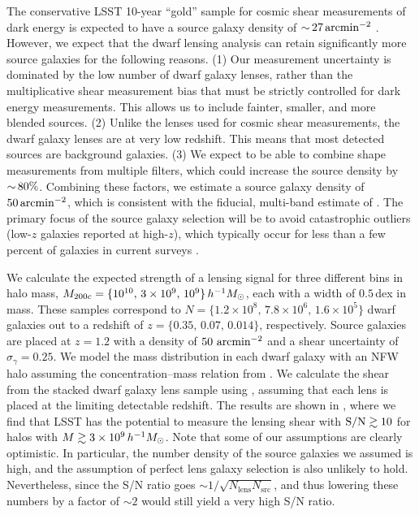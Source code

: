 The conservative LSST 10-year ``gold'' sample for cosmic shear measurements of dark energy is expected to have a source galaxy density of $ {\sim}\, 27 \mathrm{\,arcmin}^{-2}$ \citep{Chang:2013,1809.01669}. 
However, we expect that the dwarf lensing analysis can retain significantly more source galaxies for the following reasons.
(1) Our measurement uncertainty is dominated by the low number of dwarf galaxy lenses, rather than the  multiplicative shear measurement bias that must be strictly controlled for dark energy measurements. This allows us to include fainter, smaller, and more blended sources.
(2) Unlike the lenses used for cosmic shear measurements, the dwarf galaxy lenses are at very low redshift. This means that most detected sources are background galaxies.
(3) We expect to be able to combine shape measurements from multiple filters, which could increase the source density by $ {\sim}\, 80\%$. 
Combining these factors, we estimate a source galaxy density of $50 \mathrm{\,arcmin}^{-2}$, which is consistent with the fiducial, multi-band estimate of \citet{Chang:2013}.
The primary focus of the source galaxy selection will be to avoid catastrophic \photoz outliers (low-$z$ galaxies reported at high-$z$), which typically occur for less than a few percent of galaxies in current surveys \citep{1406.4407}. 

\vspace{1em} 

We calculate the expected strength of a lensing signal for three different bins in halo mass,  $M_{200c} = \{10^{10},\, 3\times10^9,\, 10^{9}\}\,h^{-1}M_\odot$, each with a width of $0.5$\,dex in mass. 
These samples correspond to $N = \{1.2\times10^8,\, 7.8\times10^6,\, 1.6\times10^5\}$ dwarf galaxies out to a redshift of $z = \{0.35,\, 0.07,\, 0.014\}$, respectively.
Source galaxies are placed at $z = 1.2$ with a density of $50 \hbox{ arcmin}^{-2}$ and a shear uncertainty of $\sigma_\gamma = 0.25$.
We model the mass distribution in each dwarf galaxy with an NFW halo assuming the concentration--mass relation from \citet{1809.07326}.
We calculate the shear from the stacked dwarf galaxy lens sample using  \citep{2018ApJS..239...35D}, assuming that each lens is placed at the limiting detectable redshift.
The results are shown in , where we find that LSST has the potential to measure the lensing shear with ${\rm S/N} \gtrsim 10$ for halos with $M \gtrsim 3 \times 10^9\,h^{-1}M_\odot$.
Note that some of our assumptions are clearly optimistic. In particular, the number density of the source galaxies we assumed is high, and the assumption of perfect lens galaxy selection is also unlikely to hold. Nevertheless, since the S/N ratio goes $\sim 1/\sqrt{N_\text{lens} N_\text{src}}$, and thus lowering these numbers by a factor of $\sim 2$ would still yield a very high S/N ratio.

